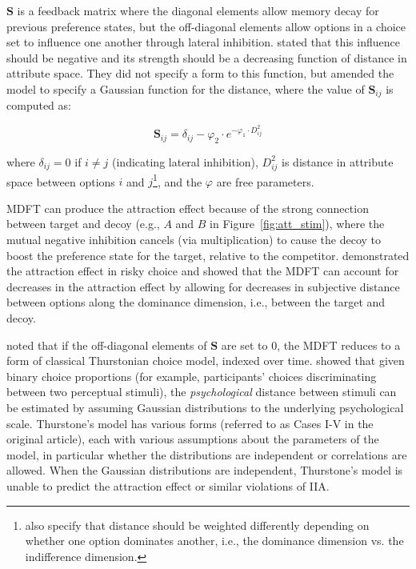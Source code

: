 $\boldsymbol{S}$ is a feedback matrix where the diagonal elements allow memory decay for previous preference states, but the off-diagonal elements allow options in a choice set to influence one another through lateral inhibition. \textcite{roeMultialternativeDecisionField2001a} stated that this influence should be negative and its strength should be a decreasing function of distance in attribute space. They did not specify a form to this function, but \textcite{hotalingTheoreticalDevelopmentsDecision2010} amended the model to specify a Gaussian function for the distance, where the value of $\boldsymbol{S}_{ij}$ is computed as:

\begin{equation}
    \boldsymbol{S}_{ij}=\delta_{ij}-\varphi_{2} \cdot e^{-\varphi_{1} \cdot D^2_{ij}}
    \label{eqn:mdft2}
\end{equation}

where $\delta_{ij}=0$ if $i\neq j$ (indicating lateral inhibition), $D^2_{ij}$ is distance in attribute space between options $i$ and $j$\footnote{\textcite{hotalingTheoreticalDevelopmentsDecision2010} also specify that distance should be weighted differently depending on whether one option dominates another, i.e., the dominance dimension vs. the indifference dimension.}, and the $\varphi$ are free parameters. 

MDFT can produce the attraction effect because of the strong connection between target and decoy (e.g., $A$ and $B$ in Figure~\ref{fig:att_stim}), where the mutual negative inhibition cancels (via multiplication) to cause the decoy to boost the preference state for the target, relative to the competitor. \textcite{mohr2017attraction} demonstrated the attraction effect in risky choice and showed that the MDFT can account for decreases in the attraction effect by allowing for decreases in subjective distance between options along the dominance dimension, i.e., between the target and decoy.

\textcite{roeMultialternativeDecisionField2001a} noted that if the off-diagonal elements of $\boldsymbol{S}$ are set to $0$, the MDFT reduces to a form of classical Thurstonian choice model, indexed over time. \textcite{thurstone1927law} showed that given binary choice proportions (for example, participants' choices discriminating between two perceptual stimuli), the \textit{psychological} distance between stimuli can be estimated by assuming Gaussian distributions to the underlying psychological scale. Thurstone's model has various forms (referred to as Cases I-V in the original article), each with various assumptions about the parameters of the model, in particular whether the distributions are independent or correlations are allowed. When the Gaussian distributions are independent, Thurstone's model is unable to predict the attraction effect or similar violations of IIA. 

